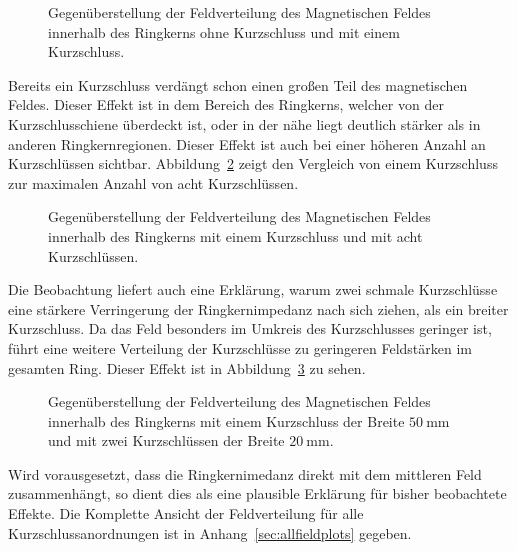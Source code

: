 \begin{figure}[htb]
	\centering
	\hspace{0.03\textwidth}
	\caption{Gegen\"uberstellung der Feldverteilung des Magnetischen Feldes innerhalb des Ringkerns ohne Kurzschluss und mit einem Kurzschluss.}
	\label{fig:0zu1ks}
\end{figure}
\par
Bereits ein Kurzschluss verd\"angt schon einen gro\ss{}en Teil des magnetischen Feldes. Dieser Effekt ist in dem Bereich des Ringkerns, welcher von der Kurzschlusschiene \"uberdeckt ist, oder in der n\"ahe liegt deutlich st\"arker als in anderen Ringkernregionen. Dieser Effekt ist auch bei einer h\"oheren Anzahl an Kurzschl\"ussen sichtbar. Abbildung~\ref{fig:1zu8ks} zeigt den Vergleich von einem Kurzschluss zur maximalen Anzahl von acht Kurzschl\"ussen.
\begin{figure}[htb]
	\centering
	\hspace{0.03\textwidth}
	\caption{Gegen\"uberstellung der Feldverteilung des Magnetischen Feldes innerhalb des Ringkerns mit einem Kurzschluss und mit acht Kurzschl\"ussen.}
	\label{fig:1zu8ks}
\end{figure}
\par
Die Beobachtung liefert auch eine Erkl\"arung, warum zwei schmale Kurzschl\"usse eine st\"arkere Verringerung der Ringkernimpedanz nach sich ziehen, als ein breiter Kurzschluss. Da das Feld besonders im Umkreis des Kurzschlusses geringer ist, f\"uhrt eine weitere Verteilung der Kurzschl\"usse zu geringeren Feldst\"arken im gesamten Ring. Dieser Effekt ist in Abbildung~\ref{fig:150zu220ks} zu sehen. 
\begin{figure}[htb]
	\centering
	\hspace{0.03\textwidth}
	\caption{Gegen\"uberstellung der Feldverteilung des Magnetischen Feldes innerhalb des Ringkerns mit einem Kurzschluss der Breite $\SI{50}{\milli\meter}$ und mit zwei Kurzschl\"ussen der Breite $\SI{20}{\milli\meter}$.}
	\label{fig:150zu220ks}
\end{figure}
\par
Wird vorausgesetzt, dass die Ringkernimedanz direkt mit dem mittleren Feld zusammenh\"angt, so dient dies als eine plausible Erkl\"arung f\"ur bisher beobachtete Effekte. Die Komplette Ansicht der Feldverteilung f\"ur alle Kurzschlussanordnungen ist in Anhang~\ref{sec:allfieldplots} gegeben.
